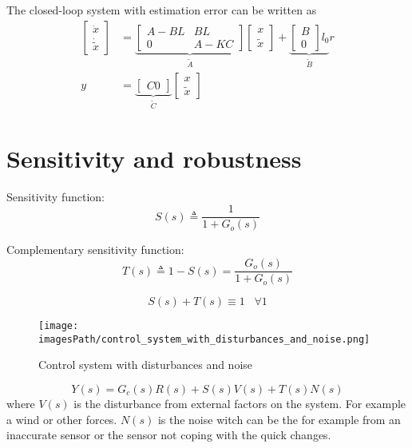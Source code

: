 \documentclass{article}
\newcommand{\imagesPath}{images}
\begin{document}
The closed-loop system with estimation error can be written as 
\begin{align*}
   \begin{bmatrix} \dot{x} \\ \dot{\tilde{x}} \end{bmatrix} &= 
   \underbrace{\begin{bmatrix} A-BL & BL \\ 0 & A-KC \end{bmatrix}}_{\tilde{A}}
   \begin{bmatrix} x \\ \tilde{x} \end{bmatrix} 
   +\underbrace{\begin{bmatrix} B \\ 0 \end{bmatrix}l_0}_{\tilde{B}}r \\
    y &= \underbrace{\begin{bmatrix} C 0 \end{bmatrix}}_{\tilde{C}}
    \begin{bmatrix} x \\ \tilde{x} \end{bmatrix}
\end{align*}

\section{Sensitivity and robustness}
Sensitivity function:
\begin{equation*}
    S(s) \triangleq \frac{1}{1+G_o(s)}
\end{equation*}

Complementary sensitivity function:
\begin{equation*}
    T(s) \triangleq 1-S(s) = \frac{G_o(s)}{1+ G_o(s)}
\end{equation*}

\begin{equation}\label{eq:s_and_t}
    S(s) + T(s) \equiv 1 \;\;\; \forall 1
\end{equation}

\begin{figure}[!h]
    \centering
    \texttt{[image: \\imagesPath/control\_system\_with\_disturbances\_and\_noise.png]}
    \caption{Control system with disturbances and noise}
\end{figure}

\begin{equation*}
    Y(s) = G_c(s)R(s) + S(s)V(s) + T(s)N(s)
\end{equation*}
where $V(s)$ is the disturbance from external factors on the system. For example a wind 
or other forces. $N(s)$ is the noise witch can be the for example from an inaccurate sensor 
or the sensor not coping with the quick changes.
\end{document}
